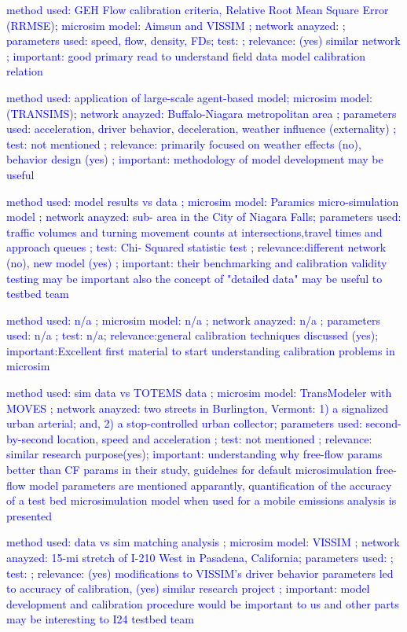 \documentclass{article}
\begin{document}
\textcolor{blue}{\cite{freeCalib} method used: GEH Flow calibration criteria, Relative Root Mean Square Error (RRMSE); microsim model: Aimsun and VISSIM ; network anayzed: ; parameters used: speed, flow, density, FDs; test: ; relevance: (yes) similar network ; important: good primary read to understand field data model calibration relation }


\textcolor{blue}{ \cite{largeCalib} method used: application of large-scale agent-based model;  microsim model: (TRANSIMS); network anayzed: Buffalo-Niagara metropolitan area ; parameters used: acceleration, driver behavior, deceleration, weather influence (externality) ; test: not mentioned ; relevance: primarily focused on weather effects (no), behavior design (yes) ; important: methodology of model development may be useful }


\textcolor{blue}{\cite{calibValid} method used: model results vs data ; microsim model: Paramics micro-simulation model ; network anayzed: sub- area in the City of Niagara Falls; parameters used: traffic volumes and turning movement counts at intersections,travel times and approach queues ; test: Chi- Squared statistic test ; relevance:different network (no), new model (yes) ; important: their benchmarking and calibration validity testing may be important also the concept of "detailed data" may be useful to testbed team }

\textcolor{blue}{\cite{guidelinesCalib} method used: n/a ; microsim model: n/a ; network anayzed: n/a ; parameters used: n/a ; test: n/a; relevance:general calibration techniques discussed (yes); important:Excellent first material to start understanding calibration problems in microsim }

\textcolor{blue}{ \cite{calibModeDis}method used: sim data vs TOTEMS data  ; microsim model: TransModeler with MOVES ; network anayzed: two streets in Burlington, Vermont: 1) a signalized urban arterial; and, 2) a stop-controlled urban collector; parameters used:  second-by-second location, speed and acceleration ; test: not mentioned ; relevance: similar research purpose(yes); important: understanding why free-flow params better than CF params in their study, guidelnes for default microsimulation free-flow model parameters are mentioned apparantly, quantification of the  accuracy of a test bed microsimulation model when used for a mobile emissions analysis is presented}

\textcolor{blue}{\cite{congestedMicro} method used: data vs sim matching analysis ; microsim model: VISSIM ; network anayzed: 15-mi stretch of I-210 West in Pasadena, California; parameters used: ; test: ; relevance: (yes)  modifications to VISSIM’s driver behavior parameters led to accuracy of calibration, (yes) similar research project ; important: model development and calibration procedure would be important to us and other parts may be interesting to I24 testbed team}
\end{document}
